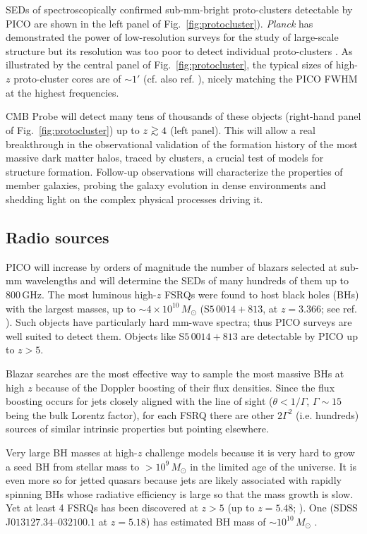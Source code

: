 \documentclass[11pt,a4paper]{article}
\def\simgt{\mathrel{\rlap{\lower 3pt\hbox{$\sim$}} \raise2.0pt\hbox{$>$}}}
\begin{document}
SEDs of spectroscopically confirmed sub-mm-bright proto-clusters detectable by
PICO  are shown in the left panel of Fig.~\ref{fig:protocluster}).
\textit{Planck} has demonstrated the power of low-resolution surveys for the
study of large-scale structure  \cite{Planck2016high_z} but its resolution was
too poor to detect individual proto-clusters \cite{Negrello2017protocl}. As
illustrated by the central panel of Fig.~\ref{fig:protocluster}, the typical
sizes of high-$z$ proto-cluster cores are of $\sim 1'$ (cf. also ref.
\cite{Alberts2014}), nicely matching the PICO FWHM at the highest frequencies.

CMB Probe will detect many tens of thousands of these objects (right-hand panel
of  Fig.~\ref{fig:protocluster}) up to $z\simgt 4$ (left panel). This will
allow a real breakthrough in the observational validation of the formation
history of the most massive dark matter halos, traced by clusters, a crucial
test of models for structure formation. Follow-up observations will
characterize the properties of member galaxies, probing the galaxy evolution in
dense environments and shedding light on the complex physical processes driving
it.

\subsection{Radio sources}

PICO will increase by orders of magnitude the number of blazars selected at
sub-mm  wavelengths and will determine the SEDs of many hundreds of them up to
800\,GHz. The most luminous high-$z$ FSRQs were found to host black holes (BHs)
with the largest masses, up to $\sim 4\times 10^{10}\,M_\odot$ (S$5\,0014+813$,
at  $z = 3.366$; see ref. \cite{Ghisellini2009}). Such objects have
particularly hard mm-wave spectra; thus PICO surveys are well suited to detect
them. Objects like S$5\,0014+813$ are detectable by PICO up to $z>5$.

Blazar searches are the most effective way to sample the most massive BHs at
high $z$ because of the Doppler boosting of their flux densities. Since the
flux boosting occurs for jets closely aligned with the line of sight ($\theta <
1/\Gamma$, $\Gamma \sim 15$ being the bulk Lorentz factor), for each FSRQ there
are other $2\Gamma^2$  (i.e. hundreds) sources of similar intrinsic properties
but pointing elsewhere.

Very large BH masses at high-$z$ challenge models because it is very hard to
grow a seed BH from stellar mass to $> 10^9\,M_\odot$ in the limited age of the
universe. It is even more so for jetted quasars because jets are likely
associated with rapidly spinning BHs whose radiative efficiency is large so
that the mass growth is slow. Yet at least 4 FSRQs has been discovered at $z>5$
(up to $z=5.48$; \cite{Romani2004}). One (SDSS J$013127.34–032100.1$ at $z =
5.18$) has estimated BH mass of $\sim 10^{10}\,M_\odot$ \cite{Ghisellini2015}.
\end{document}

